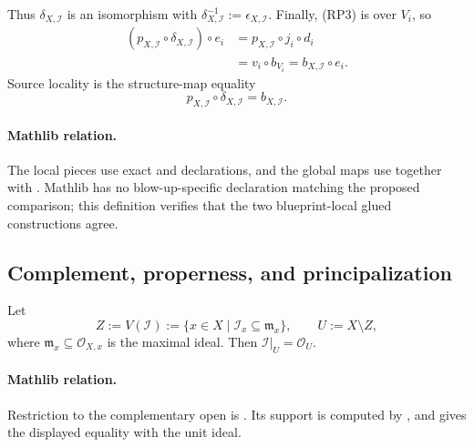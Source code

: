 \begin{definition}
\[  \]
  Thus $\delta_{X,\mathcal I}$ is an isomorphism with
  $\delta_{X,\mathcal I}^{-1}:=\epsilon_{X,\mathcal I}$.  Finally, (RP3)
  is over $V_i$, so
  \[
  \begin{aligned}
    (p_{X,\mathcal I}\circ\delta_{X,\mathcal I})\circ e_i
      &=p_{X,\mathcal I}\circ j_i\circ d_i\\
      &=v_i\circ b_{V_i}
       =b_{X,\mathcal I}\circ e_i.
  \end{aligned}
  \]
  Source locality is the structure-map equality
  \[
    p_{X,\mathcal I}\circ\delta_{X,\mathcal I}
      =b_{X,\mathcal I}.                                      \tag{RP10}
  \]

  \paragraph{Mathlib relation.}
  The local pieces use exact \texttt{}
  and \texttt{} declarations, and the global maps
  use \texttt{} together with
  \texttt{}.  Mathlib has no
  blow-up-specific declaration matching the proposed comparison; this
  definition verifies that the two blueprint-local glued constructions agree.
\end{definition}

\subsection{Complement, properness, and principalization}

\begin{lemma}
  \label{lemma:nagata-ideal-unit-off-support}

  Let
  \[
    Z:=V(\mathcal I)
      :=\{x\in X\mid\mathcal I_x\subseteq\mathfrak m_x\},
    \qquad U:=X\setminus Z,
  \]
  where $\mathfrak m_x\subseteq\mathcal O_{X,x}$ is the maximal ideal.  Then
  $\mathcal I|_U=\mathcal O_U$.

  \paragraph{Mathlib relation.}
  Restriction to the complementary open is
  \texttt{}.
  Its support is computed by
  \texttt{},
  and
  \texttt{}
  gives the displayed equality with the unit ideal.
\end{lemma}

